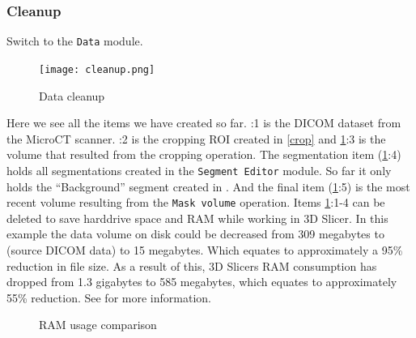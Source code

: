 \subsubsection{Cleanup}
Switch to the \texttt{Data} module.
\begin{figure}[h!]
	\centerline{
		\texttt{[image: cleanup.png]}}
	\caption{Data cleanup}\label{fig:clr}
\end{figure}
\noindent
Here we see all the items we have created so far.
:1 is the DICOM dataset from the MicroCT scanner.
:2 is the cropping ROI created in \cref{crop} and \cref{fig:clr}:3 is the volume that resulted from the cropping operation.
The segmentation item (\cref{fig:clr}:4) holds all segmentations created in the \texttt{Segment Editor} module. So far it only holds the ``Background'' segment created in . And the final item (\cref{fig:clr}:5) is the most recent volume resulting from the \texttt{Mask volume} operation.
Items \cref{fig:clr}:1-4 can be deleted to save harddrive space and RAM while working in 3D Slicer.
\noindent
In this example the data volume on disk could be decreased from 309 megabytes to (source DICOM data) to 15 megabytes.
Which equates to approximately a 95\% reduction in file size.
As a result of this, 3D Slicers RAM consumption has dropped from 1.3 gigabytes to 585 megabytes, which equates to approximately 55\% reduction.
See  for more information.
\begin{figure}
	\caption{RAM usage comparison}\label{fig:ramUC}
\end{figure}
\pagebreak


